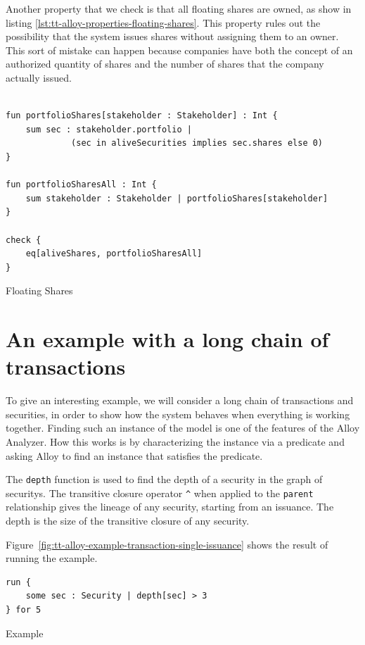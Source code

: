Another property that we check is that all floating shares are owned, as show in listing \ref{lst:tt-alloy-properties-floating-shares}. This property rules out the possibility that the system issues shares without assigning them to an owner. This sort of mistake can happen because companies have both the concept of an authorized quantity of shares and the number of shares that the company actually issued.

\begin{listing}[!h]
\begin{verbatim}

fun portfolioShares[stakeholder : Stakeholder] : Int {
    sum sec : stakeholder.portfolio | 
             (sec in aliveSecurities implies sec.shares else 0)
}

fun portfolioSharesAll : Int {
    sum stakeholder : Stakeholder | portfolioShares[stakeholder]
}

check {
    eq[aliveShares, portfolioSharesAll]
}
\end{verbatim}
\caption{Floating Shares}
\label{lst:tt-alloy-properties-floating-shares}
\end{listing}

\section{An example with a long chain of transactions}

To give an interesting example, we will consider a long chain of transactions and securities, in order to show how the system behaves when everything is working together. Finding such an instance of the model is one of the features of the Alloy Analyzer. How this works is by characterizing the instance via a predicate and asking Alloy to find an instance that satisfies the predicate. 

The \verb|depth| function is used to find the depth of a \gls{security} in the graph of \glspl{security}. The transitive closure operator \verb|^| when applied to the \verb|parent| relationship gives the lineage of any security, starting from an issuance. The depth is the size of the transitive closure of any security.

Figure~\ref{fig:tt-alloy-example-transaction-single-issuance} shows the result of running the example. 

\begin{listing}[!h]
	\begin{verbatim}
run {
    some sec : Security | depth[sec] > 3
} for 5
\end{verbatim}
	\caption{Example}
\label{lst:tt-alloy-example}
\end{listing}


